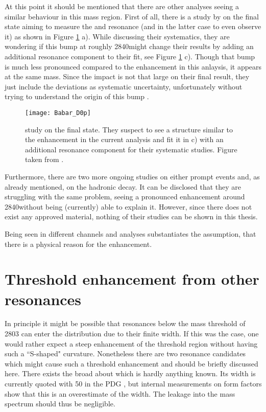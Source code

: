 At this point it should be mentioned that there are other analyses seeing a similar behaviour in this \Dz\proton mass region.
First of all, there is a study by \babar on the \Dz\proton final state aiming to measure the \LcResI and \LcResII resonance (and in the latter case to even observe it) as shown in Figure \ref{fig:Babar_D0p} a).
While discussing their systematics, they are wondering if this bump at roughly 2840\mev might change their results by adding an additional resonance component to their fit, see Figure \ref{fig:Babar_D0p} c).
Though that bump is much less pronounced compared to the enhancement in this anlaysis, it appears at the same mass.
Since the impact is not that large on their final result, they just include the deviations as systematic uncertainty, unfortunately without trying to understand the origin of this bump \cite{BaBar_D0p}.
\begin{figure}[ptb]
	\centering
	\texttt{[image: Babar\_D0p]}
	\caption{\babar study on the \Dz\proton final state. They suspect to see a structure similar to the enhancement in the current analysis and fit it in c) with an additional resonance component for their systematic studies. Figure taken from \cite{BaBar_D0p}.}
	\label{fig:Babar_D0p}
\end{figure}

Furthermore, there are two more ongoing \lhcb studies on either prompt \Dz\proton events and, as already mentioned, on the hadronic \decay{\Lb}{\Dz\proton\pim} decay.
It can be disclosed that they are struggling with the same problem, seeing a pronounced enhancement around 2840\mev without being (currently) able to explain it.
However, since there does not exist any approved material, nothing of their studies can be shown in this thesis.

Being seen in different channels and analyses substantiates the assumption, that there is a physical reason for the enhancement.

\section{Threshold enhancement from other resonances}
In principle it might be possible that resonances below the \Dz\proton mass threshold of 2803 \mev can enter the distribution due to their finite width.
If this was the case, one would rather expect a steep enhancement of the threshold region without having such a ``S-shaped" curvature.
Nonetheless there are two resonance candidates which might cause such a threshold enhancement and should be briefly discussed here.
There exists the broad  about which is hardly anything known.
Its width is currently quoted with 50 \mev in the PDG \cite{PDG}, but internal \lhcb measurements on \Lb form factors show that this is an overestimate of the  width.
The leakage into the \Dz\proton mass spectrum should thus be negligible.

